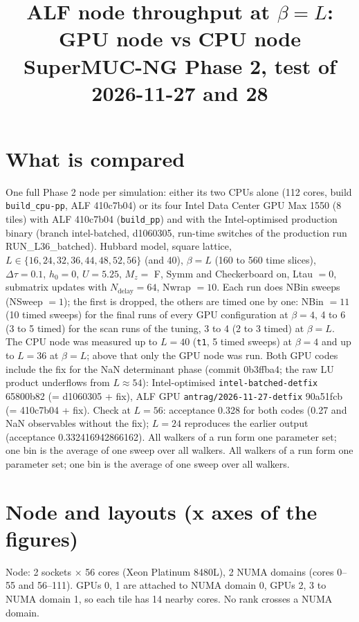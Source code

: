 \documentclass[11pt,a4paper]{article}
\title{ALF node throughput at $\beta=L$: GPU node vs CPU node\\\large SuperMUC-NG Phase 2, test of 2026-11-27 and 28}
\author{}
\date{\DataState}
\begin{document}
\maketitle
\begin{center}\end{center}

\section{What is compared}
One full Phase 2 node per simulation: either its two CPUs alone (112 cores, build \texttt{build\_cpu-pp}, ALF 410c7b04)
or its four Intel Data Center GPU Max 1550 (8 tiles) with ALF 410c7b04 (\texttt{build\_pp}) and with the Intel-optimised
production binary (branch intel-batched, d1060305, run-time switches of the production run RUN\_L36\_batched).
Hubbard model, square lattice, $L\in\{16,24,32,36,44,48,52,56\}$ (and 40), $\beta=L$ (160 to 560 time slices), $\Delta\tau=0.1$, $h_0=0$, $U=5.25$, $M_z=$ F,
Symm and Checkerboard on, Ltau $=0$, submatrix updates with $N_\text{delay}=64$, Nwrap $=10$.
Each run does NBin sweeps (NSweep $=1$); the first is dropped, the others are timed one by one: NBin $=11$ (10 timed sweeps) for the final runs of every GPU configuration at $\beta=4$, 4 to 6 (3 to 5 timed) for the scan runs of the tuning, 3 to 4 (2 to 3 timed) at $\beta=L$. The CPU node was measured up to $L=40$ (\texttt{t1}, 5 timed sweeps) at $\beta=4$ and up to $L=36$ at $\beta=L$; above that only the GPU node was run.
Both GPU codes include the fix for the NaN determinant phase (commit 0b3ffba4; the raw LU product underflows from $L\approx54$): Intel-optimised \texttt{intel-batched-detfix} 65800b82 (= d1060305 + fix), ALF GPU \texttt{antrag/2026-11-27-detfix} 90a51fcb (= 410c7b04 + fix). Check at $L=56$: acceptance 0.328 for both codes (0.27 and NaN observables without the fix); $L=24$ reproduces the earlier output (acceptance 0.332416942866162).
All walkers of a run form one parameter set; one bin is the average of one sweep over all walkers.
All walkers of a run form one parameter set; one bin is the average of one sweep over all walkers.

\section{Node and layouts (x axes of the figures)}
Node: 2 sockets $\times$ 56 cores (Xeon Platinum 8480L), 2 NUMA domains (cores 0--55 and 56--111). GPUs 0, 1 are
attached to NUMA domain 0, GPUs 2, 3 to NUMA domain 1, so each tile has 14 nearby cores. No rank crosses a NUMA domain.
\end{document}
